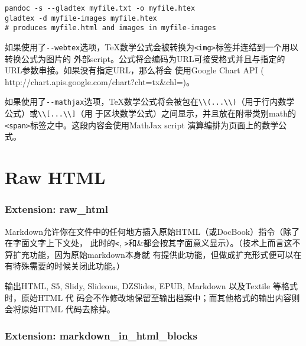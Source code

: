 \documentclass[fancyhdr,bookmark]{ctexbook}
\newcommand{\passthrough}[1]{#1}
\begin{document}
\begin{lstlisting}
pandoc -s --gladtex myfile.txt -o myfile.htex
gladtex -d myfile-images myfile.htex
# produces myfile.html and images in myfile-images
\end{lstlisting}

如果使用了\passthrough{\lstinline!--webtex!}选项，TeX数学公式会被转换为\passthrough{\lstinline!<img>!}标签并连结到一个用以转换公式为图片的
外部script。公式将会编码为URL可接受格式并且与指定的URL参数串接。如果没有指定URL，那么将会
使用Google Chart API (
http://chart.apis.google.com/chart?cht=tx\&chl=)。

如果使用了\passthrough{\lstinline!--mathjax!}选项，TeX数学公式将会被包在\passthrough{\lstinline!\\(...\\)!}（用于行内数学公式）或\passthrough{\lstinline!\\[...\\]!}（用
于区块数学公式）之间显示，并且放在附带类别math的\passthrough{\lstinline!<span>!}标签之中。这段内容会使用MathJax
script 演算编排为页面上的数学公式。

\hypertarget{raw-html}{%
\section{Raw HTML}\label{raw-html}}

\hypertarget{extension-raw_html}{%
\subsubsection{Extension: raw\_html}\label{extension-raw_html}}

Markdown允许你在文件中的任何地方插入原始HTML（或DocBook）指令（除了在字面文字上下文处，
此时的\passthrough{\lstinline!<!},
\passthrough{\lstinline!>!}和\&都会按其字面意义显示）。（技术上而言这不算扩充功能，因为原始markdown本身就
有提供此功能，但做成扩充形式便可以在有特殊需要的时候关闭此功能。）

输出HTML, S5, Slidy, Slideous, DZSlides, EPUB, Markdown 以及Textile
等格式时，原始HTML 代
码会不作修改地保留至输出档案中；而其他格式的输出内容则会将原始HTML
代码去除掉。

\hypertarget{extension-markdown_in_html_blocks}{%
\subsubsection{Extension:
markdown\_in\_html\_blocks}\label{extension-markdown_in_html_blocks}}
\end{document}
